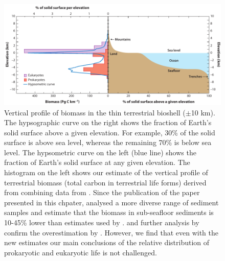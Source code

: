 \begin{figure}[!hbt]
	\centering
	\includegraphics[width=0.9\linewidth]{figures/AnnRevs/AR4.pdf}
	\caption[Terrestrial bioshell]{Vertical profile of biomass in the thin terrestrial bioshell ($\pm$10 km). The hypsographic curve on the right shows the fraction of Earth's solid surface above a given elevation. For example, 30\% of the solid surface is above sea level, whereas the remaining 70\% is below sea level. The hypsometric curve on the left (blue line) \citet{Perotti2011} shows the fraction of Earth's solid surface at any given elevation. The histogram on the left shows our estimate of the vertical profile of terrestrial biomass (total carbon in terrestrial life forms) derived from combining data from \citet{Whitman1998,Houghton2003}. Since the publication of the paper presented in this chpater, \citet{Kallmeyer2012} analysed a more diverse range of sediment samples and estimate that the biomass in sub-seafloor sediments is 10-45\% lower than estimates used by \citet{Whitman1998}. \citet{Jorgensen2012,Hinrichs2012} and further analysis by \citet{Mcmahon2014} confirm the overestimation by \citet{Whitman1998}. However, we find that even with the new estimates our main conclusions of the relative distribution of prokaryotic and eukaryotic life is not challenged.}
	\label{fig:AR4}
\end{figure}


